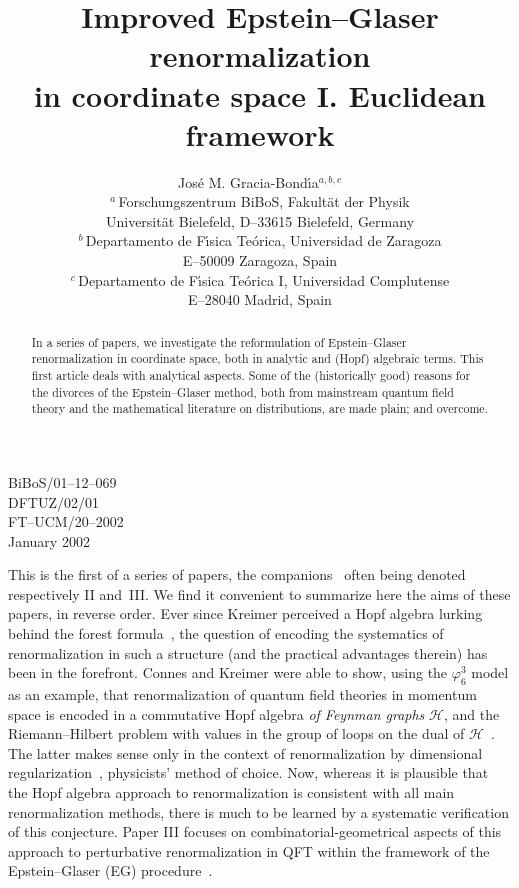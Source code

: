 \documentclass[a4paper,12pt]{article}
\title{Improved Epstein--Glaser renormalization\\
in coordinate space I. Euclidean framework}
\author{
Jos\'e M. Gracia-Bond\'{\i}a$^{a,b,c}$
\\[1pc]
$^a\,$Forschungszentrum BiBoS, Fakult\"at der Physik\\
Universit\"at Bielefeld, D--33615 Bielefeld, Germany\\
$^b\,$Departamento de F\'{\i}sica Te\'orica, Universidad de Zaragoza\\
E--50009 Zaragoza, Spain\\
$^c\,$Departamento de F\'{\i}sica Te\'orica I, Universidad Complutense\\
E--28040 Madrid, Spain
\\[1pc]
}
\makeatletter
\def\section{\@startsection{section}{1}{\z@}{-3.5ex plus -1ex minus
  -.2ex}{2.3ex plus .2ex}{\large\bf}}
\renewcommand{\H}{\mathcal{H}}     %
\newcommand{\7}{\dagger}           %
\theoremstyle{plain}
\theoremstyle{definition}
\let\savednewpage=\newpage
\newcommand{\fakenewpage}{\relax}
\newcommand{\suppressnewpage}{\let\newpage=\fakenewpage}
\newcommand{\restorenewpage}{\let\newpage=\savednewpage}
\makeatother
\begin{document}
\begin{flushright}
BiBoS/01--12--069\\
DFTUZ/02/01\\
FT--UCM/20--2002\\
January 2002
\end{flushright}


\suppressnewpage  %
\maketitle
\restorenewpage   %

\vskip 1.5cm


\begin{abstract}
In a series of papers, we investigate the reformulation of
Epstein--Glaser renormalization in coordinate space, both in analytic
and (Hopf) algebraic terms. This first article deals with analytical
aspects. Some of the (historically good) reasons for the divorces of
the Epstein--Glaser method, both from mainstream quantum field theory
and the mathematical literature on distributions, are made plain; and
overcome.
\end{abstract}


\section{Introduction}
\label{sec:introibo}


This is the first of a series of papers, the
companions~\cite{Bettina,Flora} often being denoted respectively II
and~III.
\vfill\eject
We find it convenient to summarize here the aims of these papers, in
reverse order. Ever since Kreimer perceived a Hopf algebra lurking
behind the forest formula~\cite{DirkOriginal}, the question of
encoding the systematics of renormalization in such a structure (and
the practical advantages therein) has been in the forefront. Connes
and Kreimer were able to show, using the $\varphi^3_6$ model as an
example, that renormalization of quantum field theories in momentum
space is encoded in a commutative Hopf algebra \textit{of Feynman
graphs} $\H$, and the Riemann--Hilbert problem with values in the
group of loops on the dual of $\H$~\cite{CKI,CKII}. The latter makes
sense only in the context of renormalization by dimensional
regularization~\cite{Orange,ArgentinaBrasiu}, physicists' method of
choice. Now, whereas it is plausible that the Hopf algebra approach to
renormalization is consistent with all main renormalization methods,
there is much to be learned by a systematic verification of this
conjecture. Paper III focuses on combinatorial-geometrical aspects of
this approach to perturbative renormalization in QFT within the
framework of the Epstein--Glaser (EG) procedure~\cite{EG}.
\end{document}
